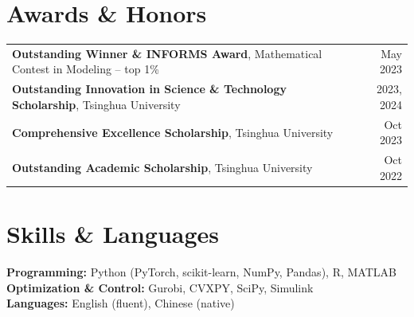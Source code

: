 \documentclass[10pt,letterpaper]{article}
\begin{document}
\section{Awards \& Honors}
\begin{tabularx}{\textwidth}{@{}Xr@{}}
\textbf{Outstanding Winner \& INFORMS Award}, Mathematical Contest in Modeling -- top 1\% & May 2023\\[0.18em]
\textbf{Outstanding Innovation in Science \& Technology Scholarship}, Tsinghua University & 2023, 2024\\[0.18em]
\textbf{Comprehensive Excellence Scholarship}, Tsinghua University & Oct 2023\\[0.18em]
\textbf{Outstanding Academic Scholarship}, Tsinghua University & Oct 2022
\end{tabularx}

\section{Skills \& Languages}
\textbf{Programming:} Python (PyTorch, scikit-learn, NumPy, Pandas), R, MATLAB\\
\textbf{Optimization \& Control:} Gurobi, CVXPY, SciPy, Simulink\\
\textbf{Languages:} English (fluent), Chinese (native)
\end{document}
